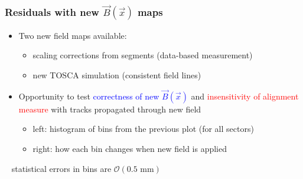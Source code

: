 \documentclass[compress]{beamer}
\begin{document}
\begin{frame}
\frametitle{Residuals with new $\vec{B}(\vec{x})$ maps}
\begin{itemize}
\item Two new field maps available:
\begin{itemize}
\item scaling corrections from segments (data-based measurement)
\item new TOSCA simulation (consistent field lines)
\end{itemize}
\item Opportunity to test \textcolor{blue}{correctness of new $\vec{B}(\vec{x})$} and \textcolor{red}{insensitivity of alignment measure} with tracks propagated through new field
\begin{itemize}
\item left: histogram of bins from the previous plot (for all sectors)
\item right: how each bin changes when new field is applied
\end{itemize}
\end{itemize}

\vspace{-0.3 cm}
\mbox{ } \hfill {\tiny statistical errors in bins are ${\mathcal O}(\mbox{0.5~mm})$}


\end{frame}
\end{document}
